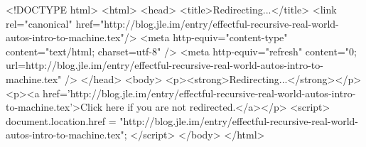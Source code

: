 <!DOCTYPE html>
<html>
<head>
<title>Redirecting...</title>
<link rel="canonical" href="http://blog.jle.im/entry/effectful-recursive-real-world-autos-intro-to-machine.tex"/>
<meta http-equiv="content-type" content="text/html; charset=utf-8" />
<meta http-equiv="refresh" content="0; url=http://blog.jle.im/entry/effectful-recursive-real-world-autos-intro-to-machine.tex" />
</head>
<body>
  <p><strong>Redirecting...</strong></p>
  <p><a href='http://blog.jle.im/entry/effectful-recursive-real-world-autos-intro-to-machine.tex'>Click here if you are not redirected.</a></p>
  <script>
    document.location.href = "http://blog.jle.im/entry/effectful-recursive-real-world-autos-intro-to-machine.tex";
  </script>
</body>
</html>
